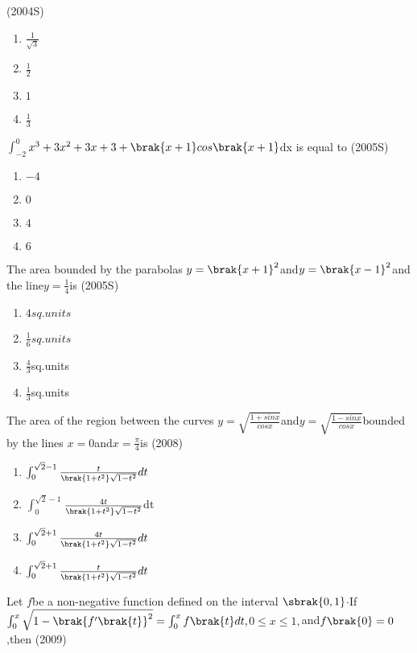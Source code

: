 \hfill{(2004S)}
\begin{enumerate}
\item$\frac{1}{\sqrt{3}}$
\item$\frac{1}{2}$
\item$1$
\item$\frac{1}{3}$
\end{enumerate}
\item $\int_{-2}^{0}$${x^3}+3{x^2}+3x+3+\brak{x+1}cos\brak{x+1}$dx is equal to
\hfill{(2005S)}
\begin{enumerate}
\item$-4$
\item$0$
\item$4$
\item$6$
\end{enumerate}
\item The area bounded by the parabolas $y=\brak{x+1}^2$and$y=\brak{x-1}^2$and the line$y=\frac{1}{4}$is
\hfill{(2005S)}
\begin{enumerate}
\item $4 sq.units$
\item$ \frac{1}{6}sq.units$
\item$\frac{4}{3}$sq.units
\item$\frac{1}{3}$sq.units
\end{enumerate}
\item The area of the region between the curves $y=\sqrt{\frac{1+sinx}{cosx}}$and$y=\sqrt{\frac{1-sinx}{cosx}}$bounded by the lines $x=0$and$x=\frac{\pi}{4}$is
\hfill{(2008)}
\begin{enumerate}
\item$\int_{0}^{\sqrt{2}-1}\frac{t}{\brak{1+{t^2}}\sqrt{1-{t^2}}}dt$
\item$\int_{0}^{\sqrt{2}-1}$$\frac{4t}{\brak{1+{t^2}}\sqrt{1-{t^2}}}$dt
\item$\int_{0}^{\sqrt{2}+1}\frac{4t}
{\brak{1+{t^2}}\sqrt{1-{t^2}}}dt$
\item$\int_{0}^{\sqrt{2}+1}\frac{t}{\brak{1+{t^2}}\sqrt{1-{t^2}}}dt$
\end{enumerate}
\item Let $f$be a non-negative function defined on the interval $\sbrak{0,1}$$\cdot$If$\int_{0}^{x}\sqrt{1-\brak{f'\brak{t}}^2}=\int_{0}^{x}f\brak{t}dt,$$    0\leq x \leq 1,$and$f\brak{0}=0$,then
\hfill{(2009)}
$$
